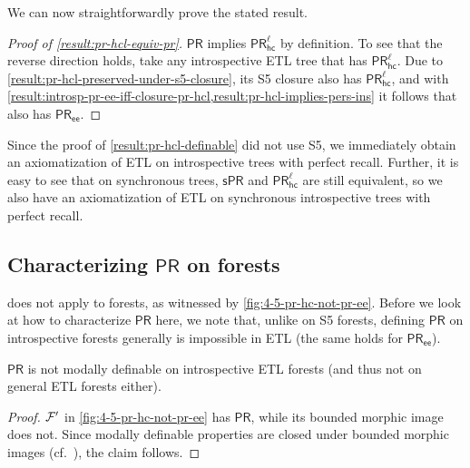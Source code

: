 \documentclass{article}
\newcommand{\PR}{\ensuremath{\mathsf{PR}}\xspace}
\newcommand{\PRs}{\ensuremath{\mathsf{sPR}}\xspace}
\newcommand{\PRhcl}{\ensuremath{\mathsf{PR_{hc}^\ell}}\xspace}
\newcommand{\PRee}{\ensuremath{\mathsf{PR_{ee}}}\xspace}
\newcounter{#1}
\begin{document}
We can now straightforwardly prove the stated result.
\begin{proof}[Proof of \cref{result:pr-hcl-equiv-pr}]
  \PR implies \PRhcl by definition.
  To see that the reverse direction holds,
  take any introspective ETL tree \F that has \PRhcl.
  Due to \cref{result:pr-hcl-preserved-under-s5-closure},
  its S5 closure also has \PRhcl,
  and with \cref{result:introsp-pr-ee-iff-closure-pr-hcl,result:pr-hcl-implies-pers-ins}
  it follows that \F also has \PRee.
\end{proof}















\medskip



Since the proof of \cref{result:pr-hcl-definable} did not use S5,
we immediately obtain an axiomatization of ETL
on introspective trees with perfect recall.
Further, it is easy to see that on synchronous trees, \PRs and \PRhcl are still equivalent,
so we also have an axiomatization of ETL on synchronous introspective trees with perfect recall.

\subsection{Characterizing \PR on forests}
\label{sec:char-pr-forests}

 does not apply to forests,
as witnessed by \cref{fig:4-5-pr-hc-not-pr-ee}.
Before we look at how to characterize \PR here,
we note that, unlike on S5 forests, defining \PR on introspective forests generally is impossible in ETL
(the same holds for \PRee).

\begin{proposition}
  \PR is not modally definable on introspective ETL forests
  (and thus not on general ETL forests either).
\end{proposition}
\begin{proof}
  $\mathcal{F}'$ in \cref{fig:4-5-pr-hc-not-pr-ee} has \PR,
  while its bounded morphic image \F does not.
  Since modally definable properties are closed under bounded morphic images
  (cf.~\cite{blackburn_modal_2001}),
  the claim follows.
\end{proof}
\end{document}
